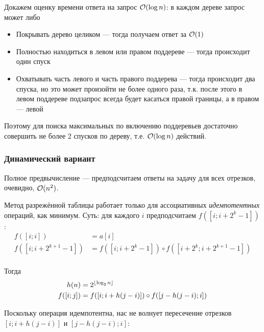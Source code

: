 Докажем оценку времени ответа на запрос $\mathcal{O}(\log n)$:
в каждом дереве запрос может либо
\begin{itemize}
    \item Покрывать дерево целиком
    --- тогда получаем ответ за $\mathcal{O}(1)$

    \item Полностью находиться в
    левом или правом поддереве
    --- тогда происходит один спуск

    \item Охватывать часть левого и часть правого поддерева
    --- тогда происходит два спуска,
    но это может произойти не более одного раза,
    т.к. после этого в левом поддереве
    подзапрос всегда будет касаться правой границы,
    а в правом --- левой
\end{itemize}

Поэтому для поиска максимальных по включению поддеревьев
достаточно совершить не более 2 спусков по дереву,
т.е. $\mathcal{O}(\log n)$ действий.

\subsubsection{Динамический вариант}
Полное предвычисление --- предподсчитаем ответы
на задачу для всех отрезков, очевидно, $\mathcal{O}(n^2)$.

Метод разрежённой таблицы работает только для ассоциативных
\emph{идемпотентных} операций, как минимум.
Суть: для каждого $i$ предподсчитаем $f([i; i + 2^k - 1])$:
\begin{align*}
    f([i; i]) & = a[i] \\
    f([i; i + 2^{k + 1} - 1]) & = f([i; i + 2^k - 1]) \circ f([i + 2^k; i + 2^{k + 1} - 1]) \\
\end{align*}

Тогда
\begin{align*}
    h(n) & = 2^{\left \lfloor \log_2 n \right \rfloor} \\
    f([i; j]) & = f([i; i + h(j - i)]) \circ f([j - h(j - i); i]) \\
\end{align*}

Поскольку операция идемпотентна, нас не волнует пересечение
отрезков ${[i; i + h(j - i)]}$ и ${[j - h(j - i); i]}$:
\begin{center}
\end{center}

